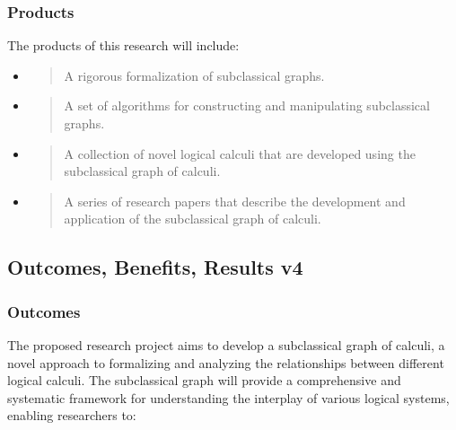 \hypertarget{products-1}{%
\subsubsection{Products}\label{products-1}}

The products of this research will include:

\begin{itemize}
\item
  \begin{quote}
  A rigorous formalization of subclassical graphs.
  \end{quote}
\item
  \begin{quote}
  A set of algorithms for constructing and manipulating subclassical
  graphs.
  \end{quote}
\item
  \begin{quote}
  A collection of novel logical calculi that are developed using the
  subclassical graph of calculi.
  \end{quote}
\item
  \begin{quote}
  A series of research papers that describe the development and
  application of the subclassical graph of calculi.
  \end{quote}
\end{itemize}

\hypertarget{outcomes-benefits-results-v4}{%
\subsection{Outcomes, Benefits, Results
v4}\label{outcomes-benefits-results-v4}}

\hypertarget{outcomes-2}{%
\subsubsection{Outcomes}\label{outcomes-2}}

The proposed research project aims to develop a subclassical graph of
calculi, a novel approach to formalizing and analyzing the relationships
between different logical calculi. The subclassical graph will provide a
comprehensive and systematic framework for understanding the interplay
of various logical systems, enabling researchers to:

